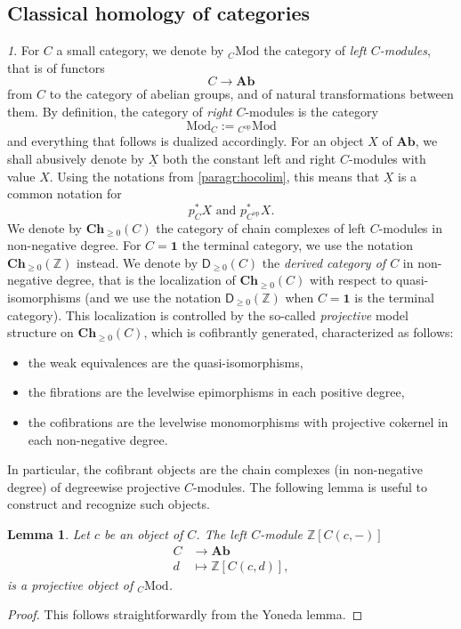 \documentclass[reqno]{amsart}
\theoremstyle{plain}
\newtheorem{lemma}[subsubsection]{Lemma}
\theoremstyle{definition}
\theoremstyle{remark}
\newtheorem{paragr}[subsubsection]{} %
\newcommand{\nmbr}[1]{\mathbb #1}
\newcommand{\Z}{\nmbr{Z}}
\newcommand{\homset}[3]{#1(#2,#3)} %
\newcommand{\op}{{\mathrm{op}}} %
\newcommand{\ctg}[1]{\mathbf{#1}}  %
\newcommand{\Ch}[1]{\ctg{Ch}_{#1}} %
\newcommand{\Chp}{\Ch{\geq 0}} %
\newcommand{\Ab}{\ctg{Ab}} %
\newcommand{\Term}{\ctg{1}} %
\newcommand{\RMod}[1]{\mathrm{Mod}_{#1}} %
\newcommand{\LMod}[1]{{}_{#1}\mathrm{Mod}} %
\newcommand{\functor}[1]{\mathsf{#1}} %
\newcommand{\cst}[1]{\underline{#1}} %
\newcommand{\Derp}[1]{\functor{D}_{\geq 0}(#1)}
\newcommand{\nbd}{\nobreakdash} %
\begin{document}
\subsection{Classical homology of categories}
\begin{paragr}\label{paragr:homalg}
  For $C$ a small category, we denote by $\LMod{C}$ the category of
  \emph{left $C$\nbd-modules}, that is of functors
  \[
    C \to \Ab
  \]
  from $C$ to the category of abelian groups, and of natural
  transformations between them. By definition, the category of \emph{right}
  $C$\nbd-modules is the category
  \[
    \RMod{C}:=\LMod{C^{\op}}
  \]
  and everything that follows is dualized accordingly. For an object
  $X$ of $\Ab$, we shall abusively denote by $\cst{X}$ both the constant left
  and right $C$\nbd-modules with value $X$. Using the notations from
  \ref{paragr:hocolim}, this means that $\cst{X}$ is a common notation for
  \[
   p_C^*X \text{ and } p_{C^\op}^*X.
  \]
  We denote by $\Chp(C)$ the category of chain complexes
  of left $C$\nbd-modules in non-negative degree. For $C=\Term$ the
  terminal category, we use the notation $\Chp(\Z)$ instead. 
  We denote by $\Derp{C}$ the \emph{derived
 category of $C$} in non-negative degree, that is the
localization of $\Chp(C)$ with respect to
 quasi-isomorphisms (and we use the notation $\Derp{\Z}$ when
 $C=\Term$ is the terminal category). This localization is controlled by the
  so-called \emph{projective} model structure on $\Chp(C)$, which is
  cofibrantly generated,
  characterized as follows:
  \begin{itemize}
  \item the weak equivalences are the quasi-isomorphisms,
  \item the fibrations are the levelwise epimorphisms in each positive
    degree,
  \item the cofibrations are the levelwise monomorphisms with
    projective cokernel in each non-negative degree.
  \end{itemize}
  In particular, the cofibrant objects are the chain complexes (in
  non-negative degree) of degreewise projective
  $C$\nbd-modules. The following lemma is useful to
  construct and recognize such objects.
\end{paragr}
\begin{lemma}\label{lemma:freeisproj}
  Let $c$ be an object of $C$. The left $C$\nbd-module $\Z[\homset{C}{c}{-}]$
  \[
    \begin{aligned}
      C &\to \Ab\\
      d &\mapsto \Z[\homset{C}{c}{d}],
    \end{aligned}
  \]
  is a projective object of $\LMod{C}$.
\end{lemma}
\begin{proof}
  This follows straightforwardly from the Yoneda lemma.
\end{proof}
\end{document}
